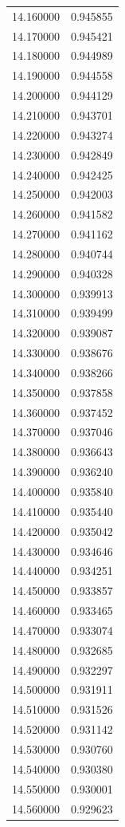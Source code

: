 \begin{tabular}{rr}
14.160000 & 0.945855 \\
14.170000 & 0.945421 \\
14.180000 & 0.944989 \\
14.190000 & 0.944558 \\
14.200000 & 0.944129 \\
14.210000 & 0.943701 \\
14.220000 & 0.943274 \\
14.230000 & 0.942849 \\
14.240000 & 0.942425 \\
14.250000 & 0.942003 \\
14.260000 & 0.941582 \\
14.270000 & 0.941162 \\
14.280000 & 0.940744 \\
14.290000 & 0.940328 \\
14.300000 & 0.939913 \\
14.310000 & 0.939499 \\
14.320000 & 0.939087 \\
14.330000 & 0.938676 \\
14.340000 & 0.938266 \\
14.350000 & 0.937858 \\
14.360000 & 0.937452 \\
14.370000 & 0.937046 \\
14.380000 & 0.936643 \\
14.390000 & 0.936240 \\
14.400000 & 0.935840 \\
14.410000 & 0.935440 \\
14.420000 & 0.935042 \\
14.430000 & 0.934646 \\
14.440000 & 0.934251 \\
14.450000 & 0.933857 \\
14.460000 & 0.933465 \\
14.470000 & 0.933074 \\
14.480000 & 0.932685 \\
14.490000 & 0.932297 \\
14.500000 & 0.931911 \\
14.510000 & 0.931526 \\
14.520000 & 0.931142 \\
14.530000 & 0.930760 \\
14.540000 & 0.930380 \\
14.550000 & 0.930001 \\
14.560000 & 0.929623 \\

\end{tabular}

